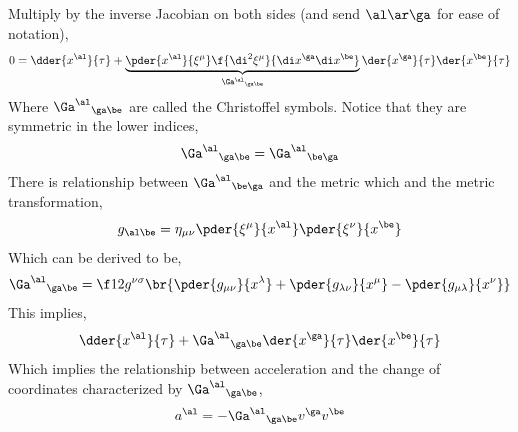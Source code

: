 \documentclass{article}
\begin{document}
Multiply by the inverse Jacobian on both sides (and send $\al \ar \ga$ for ease of notation),
\[ 0 = \dder{x^\al}{\tau}  + \underbrace{\pder{x^\al}{\xi^\mu} \f{\di^2\xi^\mu}{\di x^\ga\di x^\be}}_{{\Ga^\al}_{\ga\be}}\der{x^\ga}{\tau}\der{x^\be}{\tau} \]
Where ${\Ga^\al}_{\ga\be}$ are called the Christoffel symbols. Notice that they are symmetric in the lower indices,
\[ {\Ga^\al}_{\ga\be} = {\Ga^\al}_{\be\ga} \]
There is relationship between ${\Ga^\al}_{\be\ga}$ and the metric which and the metric transformation,
\[ g_{\al\be} = \eta_{\mu\nu} \pder{\xi^\mu}{x^\al}\pder{\xi^\nu}{x^\be} \]
Which can be derived to be,
\[ {\Ga^\al}_{\ga\be} = \f12 g^{\nu\sigma}\br{\pder{g_{\mu\nu}}{x^\lambda} + \pder{g_{\lambda\nu}}{x^\mu} - \pder{g_{\mu\lambda}}{x^\nu}} \]
This implies,
\[ \dder{x^\al}{\tau} + {\Ga^\al}_{\ga\be} \der{x^\ga}{\tau} \der{x^\be}{\tau} \]
Which implies the relationship between acceleration and the change of coordinates characterized by ${\Ga^\al}_{\ga\be}$,
\[ a^\al = - {\Ga^\al}_{\ga\be}  v^\ga  v^\be\]
\end{document}
